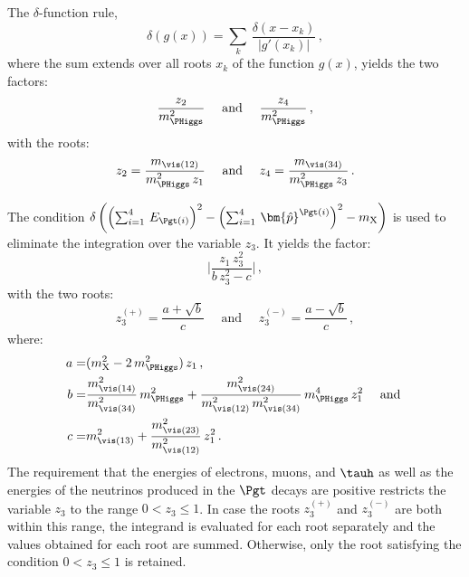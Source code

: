 The $\delta$-function rule,
\begin{equation*} 
\delta \left( g(x) \right) = \sum_{k} \, \frac{\delta \left( x - x_{k}
  \right)}{\vert g'(x_{k}) \vert} \, ,
\end{equation*}
where the sum extends over all roots $x_{k}$ of the function $g(x)$,
yields the two factors:
\begin{equation*}
\frac{z_{2}}{m_{\PHiggs}^{2}} \quad \mbox{ and } \quad \frac{z_{4}}{m_{\PHiggs}^{2}} \, ,
\end{equation*}
with the roots:
\begin{equation*}
z_{2} = \frac{m_{\vis(12)}}{m_{\PHiggs}^{2} \, z_{1}} \quad \mbox{ and } \quad z_{4} = \frac{m_{\vis(34)}}{m_{\PHiggs}^{2} \, z_{3}} \, .
\end{equation*}

The condition
$\delta\left( \left(\sum_{i=1}^{4} \, E_{\Pgt(i)}\right)^{2} - \left(\sum_{i=1}^{4} \, \bm{\hat{p}}^{\Pgt(i)}\right)^{2} - m_{\textrm{X}} \right)$
is used to eliminate the integration over the variable $z_{3}$.
It yields the factor:
\begin{equation}
\lvert \frac{z_{1} \, z_{3}^{2}}{b \, z_{3}^{2} - c} \rvert \, ,
\label{eq:deltaFuncFactor}
\end{equation}
with the two roots:
\begin{equation*}
z_{3}^{(+)} = \frac{a + \sqrt{b}}{c} \quad \mbox{ and } \quad z_{3}^{(-)} = \frac{a - \sqrt{b}}{c} \, ,
\end{equation*}
where:
\begin{align}
a = & (m_{\textrm{X}}^{2} - 2 \, m_{\PHiggs}^{2}) \, z_{1} \, , \nonumber \\
b = & \frac{m_{\vis(14)}^{2}}{m_{\vis(34)}^{2}} \, m_{\PHiggs}^{2} + \frac{m_{\vis(24)}^{2}}{m_{\vis(12)}^{2} \, m_{\vis(34)}^{2}} \, m_{\PHiggs}^{4} \, z_{1}^{2} \quad \mbox{ and } \nonumber \\
c = & m_{\vis(13)}^{2} + \frac{m_{\vis(23)}^{2}}{m_{\vis(12)}^{2}} \, z_{1}^{2} \, .
\end{align}
The requirement that the energies of electrons, muons, and $\tauh$ 
as well as the energies of the neutrinos produced in the $\Pgt$ decays are positive
restricts the variable $z_{3}$ to the range $0 < z_{3} \leq 1$.
In case the roots $z_{3}^{(+)}$ and $z_{3}^{(-)}$ are both within this range,
the integrand is evaluated for each root separately and the values obtained for each root are summed.
Otherwise, only the root satisfying the condition $0 < z_{3} \leq 1$ is retained.

